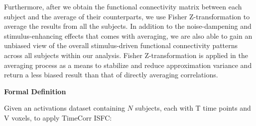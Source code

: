 \documentclass[11pt]{article}
\begin{document}
Furthermore, after we obtain the functional connectivity matrix between each subject and the average of their counterparts, we use Fisher Z-transformation to average the results from all the subjects. In addition to the noise-dampening and stimulus-enhancing effects that comes with averaging, we are also able to gain an unbiased view of the overall stimulus-driven functional connectivity patterns across all subjects within our analysis. Fisher Z-transformation is applied in the averaging process as a means to stabilize and reduce approximation variance and return a less biased result than that of directly averaging correlations.

\large{\textbf{Formal Definition}}

\normalsize
Given an activations dataset containing $N$ subjects, each with T time points and V voxels, to apply TimeCorr ISFC:
\end{document}
